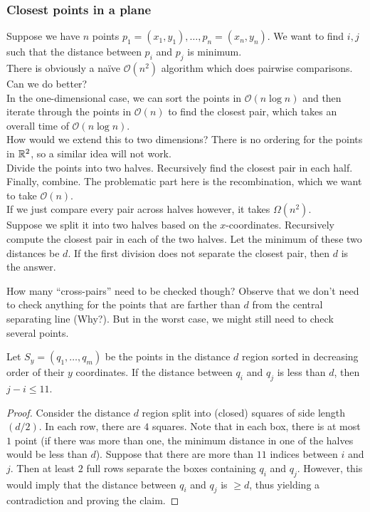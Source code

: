 \subsubsection{Closest points in a plane}
\label{subsubsec: closest points in a plane}

Suppose we have $n$ points $p_1=(x_1,y_1),\ldots,p_n=(x_n,y_n)$. We want to find $i,j$ such that the distance between $p_i$ and $p_j$ is minimum.\\

There is obviously a na\"ive $\mathcal{O}(n^2)$ algorithm which does pairwise comparisons. Can we do better?\\

In the one-dimensional case, we can sort the points in $\mathcal{O}(n\log n)$ and then iterate through the points in $\mathcal{O}(n)$ to find the closest pair, which takes an overall time of $\mathcal{O}(n\log n)$.\\
How would we extend this to two dimensions? There is no ordering for the points in $\mathbb{R}^2$, so a similar idea will not work.\\

Divide the points into two halves. Recursively find the closest pair in each half. Finally, combine. The problematic part here is the recombination, which we want to take $\mathcal{O}(n)$.\\
If we just compare every pair across halves however, it takes $\Omega(n^2)$.\\

Suppose we split it into two halves based on the $x$-coordinates. Recursively compute the closest pair in each of the two halves. Let the minimum of these two distances be $d$. If the first division does not separate the closest pair, then $d$ is the answer.

How many ``cross-pairs'' need to be checked though? Observe that we don't need to check anything for the points that are farther than $d$ from the central separating line (Why?). But in the worst case, we might still need to check several points.

\begin{lemma}
	Let $S_y=(q_1,\ldots,q_m)$ be the points in the distance $d$ region sorted in decreasing order of their $y$ coordinates. If the distance between $q_i$ and $q_j$ is less than $d$, then $j-i\leq 11$.
\end{lemma}
\begin{proof}
	Consider the distance $d$ region split into (closed) squares of side length $(d/2)$. In each row, there are $4$ squares. Note that in each box, there is at most $1$ point (if there was more than one, the minimum distance in one of the halves would be less than $d$). Suppose that there are more than $11$ indices between $i$ and $j$. Then at least $2$ full rows separate the boxes containing $q_i$ and $q_j$. However, this would imply that the distance between $q_i$ and $q_j$ is $\geq d$, thus yielding a contradiction and proving the claim.
\end{proof}

